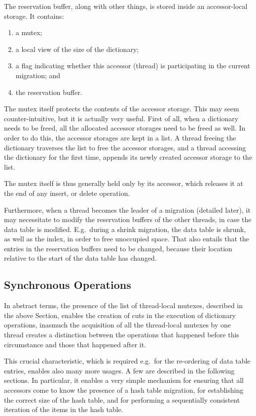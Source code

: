 The reservation buffer, along with other things, is stored inside an accessor-local storage.
It contains:
\begin{enumerate}
	\item a mutex;
	\item a local view of the size of the dictionary;
	\item a flag indicating whether this accessor (thread) is participating in the current migration; and
	\item the reservation buffer.
\end{enumerate}

The mutex itself protects the contents of the accessor storage.
This may seem counter-intuitive, but it is actually very useful.
First of all, when a dictionary needs to be freed, all the allocated accessor storages need to be freed as well.
In order to do this, the accessor storages are kept in a list.
A thread freeing the dictionary traverses the list to free the accessor storages, and a thread accessing the dictionary for the first time, appends its newly created accessor storage to the list.

The mutex itself is thus generally held only by its accessor, which releases it at the end of any insert, or delete operation.

Furthermore, when a thread becomes the leader of a migration (detailed later), it may necessitate to modify the reservation buffers of the other threads, in case the data table is modified.
E.g.\ during a shrink migration, the data table is shrunk, as well as the index, in order to free unoccupied space.
That also entails that the entries in the reservation buffers need to be changed, because their location relative to the start of the data table has changed.


\subsection{Synchronous Operations}\label{subsec:synchronous-operations}

In abstract terms, the presence of the list of thread-local mutexes, described in the above Section, enables the creation of cuts in the execution of dictionary operations, inasmuch the acquisition of all the thread-local mutexes by one thread creates a distinction between the operations that happened before this circumstance and those that happened after it.

This crucial characteristic, which is required e.g.\ for the re-ordering of data table entries, enables also many more usages.
A few are described in the following sections.
In particular, it enables a very simple mechanism for ensuring that all accessors come to know the presence of a hash table migration, for establishing the correct size of the hash table, and for performing a sequentially consistent iteration of the items in the hash table.

